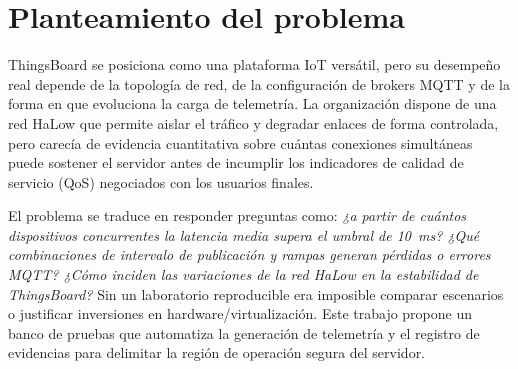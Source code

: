 \section{Planteamiento del problema}
ThingsBoard se posiciona como una plataforma IoT vers\'atil, pero su desempe\~no real depende de la topolog\'ia de red, de la configuraci\'on de brokers MQTT y de la forma en que evoluciona la carga de telemetr\'ia. La organizaci\'on dispone de una red HaLow que permite aislar el tr\'afico y degradar enlaces de forma controlada, pero carec\'ia de evidencia cuantitativa sobre cu\'antas conexiones simult\'aneas puede sostener el servidor antes de incumplir los indicadores de calidad de servicio (QoS) negociados con los usuarios finales.

El problema se traduce en responder preguntas como: \textit{¿a partir de cu\'antos dispositivos concurrentes la latencia media supera el umbral de \SI{10}{\milli\second}? ¿Qu\'e combinaciones de intervalo de publicaci\'on y rampas generan p\'erdidas o errores MQTT? ¿C\'omo inciden las variaciones de la red HaLow en la estabilidad de ThingsBoard?} Sin un laboratorio reproducible era imposible comparar escenarios o justificar inversiones en hardware/virtualizaci\'on. Este trabajo propone un banco de pruebas que automatiza la generaci\'on de telemetr\'ia y el registro de evidencias para delimitar la regi\'on de operaci\'on segura del servidor.
